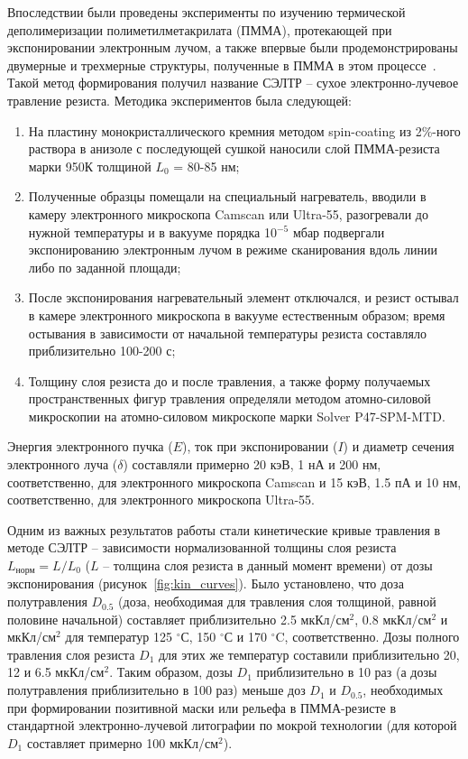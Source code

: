 Впоследствии были проведены эксперименты по изучению термической деполимеризации полиметилметакрилата (ПММА), протекающей при экспонировании электронным лучом, а также впервые были продемонстрированы двумерные и трехмерные структуры, полученные в ПММА в этом процессе~\cite{Bruk_2013}. Такой метод формирования получил название СЭЛТР -- сухое электронно-лучевое травление резиста. Методика экспериментов была следующей:
\begin{enumerate}
	\item На пластину монокристаллического кремния методом \textquotedbl spin-coating\textquotedbl{} из 2\%-ного раствора в анизоле с последующей сушкой наносили слой ПММА-резиста марки 950К толщиной $L_0$ = 80-85 нм;
	\item Полученные образцы помещали на специальный нагреватель, вводили в камеру электронного микроскопа Camscan или Ultra-55, разогревали до нужной температуры и в вакууме порядка 10$^{-5}$ мбар подвергали экспонированию электронным лучом в режиме сканирования вдоль линии либо по заданной площади;
	\item После экспонирования нагревательный элемент отключался, и резист остывал в камере электронного микроскопа в вакууме естественным образом; время остывания в зависимости от начальной температуры резиста составляло приблизительно 100-200 с;
	\item Толщину слоя резиста до и после травления, а также форму получаемых пространственных фигур травления определяли методом атомно-силовой микроскопии на атомно-силовом микроскопе марки Solver P47-SPM-MTD.
\end{enumerate}

Энергия электронного пучка ($E$), ток при экспонировании ($I$) и диаметр сечения электронного луча ($\delta$) составляли примерно 20 кэВ, 1 нА и 200 нм, соответственно, для электронного микроскопа Camscan и 15 кэВ, 1.5 пА и 10 нм, соответственно, для электронного микроскопа Ultra-55.

Одним из важных результатов работы стали кинетические кривые травления в методе СЭЛТР -- зависимости нормализованной толщины слоя резиста $L_{\text{норм}} = L/L_0$ ($L$ -- толщина слоя резиста в данный момент времени) от дозы экспонирования (рисунок~\ref{fig:kin_curves}). Было установлено, что доза полутравления $D_{0.5}$ (доза, необходимая для травления слоя толщиной, равной половине начальной) составляет приблизительно 2.5 мкКл/см$^2$, 0.8 мкКл/см$^2$ и  мкКл/см$^2$ для температур 125 $^\circ$С, 150 $^\circ$С и 170 $^\circ$C, соответственно. Дозы полного травления слоя резиста $D_1$ для этих же температур составили приблизительно 20, 12 и 6.5 мкКл/см$^2$. Таким образом, дозы $D_1$ приблизительно в 10 раз (а дозы полутравления приблизительно в 100 раз) меньше доз $D_1$ и $D_{0.5}$, необходимых при формировании позитивной маски или рельефа в ПММА-резисте в стандартной электронно-лучевой литографии по \textquotedbl мокрой\textquotedbl{} технологии (для которой $D_1$ составляет примерно 100 мкКл/см$^2$).


